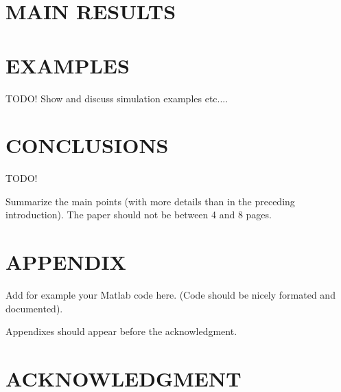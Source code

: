 \documentclass[letterpaper, 10 pt, conference]{ieeeconf}  %
\newcommand{\todo}{{\color{red} TODO!}}
\begin{document}
\section{MAIN RESULTS}


\section{EXAMPLES}
\todo
Show and discuss simulation examples etc....



\section{CONCLUSIONS}
\todo

Summarize the main points (with more details than in the preceding introduction).
The paper should not be between 4 and 8 pages.



\addtolength{\textheight}{-12cm}   %



\section*{APPENDIX}

Add for example your Matlab code here. (Code should be nicely formated and documented).

Appendixes should appear before the acknowledgment.

\section*{ACKNOWLEDGMENT}
\end{document}
